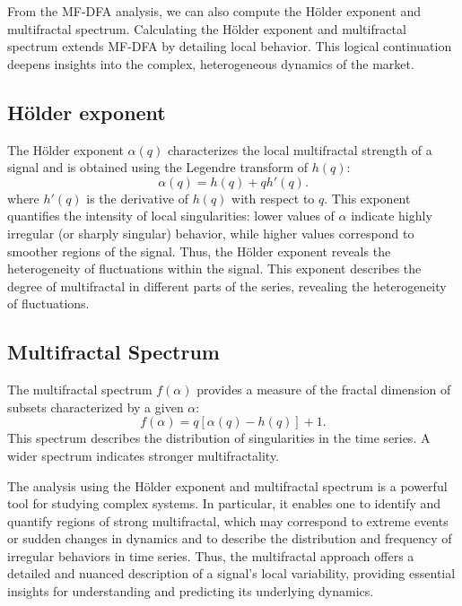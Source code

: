 \documentclass[11pt]{extarticle}
\begin{document}
From the MF-DFA analysis, we can also compute the Hölder exponent and multifractal spectrum.
Calculating the Hölder exponent and multifractal spectrum extends MF-DFA by detailing local behavior.
This logical continuation deepens insights into the complex, heterogeneous dynamics of the market.



\subsection{Hölder exponent}
The Hölder exponent $\alpha(q)$ characterizes the local multifractal strength of a signal and is obtained using the Legendre transform of $h(q)$:
\begin{equation}
\alpha(q) = h(q) + q h'(q).
\end{equation}
where $h'(q)$ is the derivative of $h(q)$ with respect to $q$. This exponent quantifies the intensity of local
singularities: lower values of $\alpha$ indicate highly irregular (or sharply singular) behavior, while higher
values correspond to smoother regions of the signal. Thus, the Hölder exponent reveals the heterogeneity of fluctuations within the signal.
This exponent describes the degree of multifractal in different parts of the series, revealing the heterogeneity of fluctuations.

\subsection{Multifractal Spectrum}
The multifractal spectrum $f(\alpha)$ provides a measure of the fractal dimension of subsets characterized by a given $\alpha$:
\begin{equation}
f(\alpha) = q [\alpha(q) - h(q)] + 1.
\end{equation}
This spectrum describes the distribution of singularities in the time series. A wider spectrum indicates stronger multifractality.

The analysis using the Hölder exponent and multifractal spectrum is a powerful tool for studying complex systems.
In particular, it enables one to identify and quantify regions of strong multifractal, which may correspond to extreme
events or sudden changes in dynamics and to describe the distribution and frequency of irregular behaviors in time series.
Thus, the multifractal approach offers a detailed and nuanced description of a signal's local variability, providing
essential insights for understanding and predicting its underlying dynamics. \\
\end{document}
